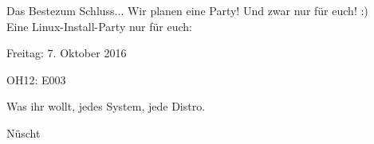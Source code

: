 \begin{frame}{Das Beste}{zum Schluss...}
	Wir planen eine Party! Und zwar nur für euch! :)\\
	Eine Linux-Install-Party nur für euch:\\
	\begin{center}
	\begin{description}[<+->]
		\item[Wann?] Freitag: 7. Oktober 2016 
		\item[Wo?] OH12: E003
		\item[Was?] Was ihr wollt, jedes System, jede Distro.
		\item[Koscht?] Nüscht
	\end{description}
	\end{center}
\end{frame}

